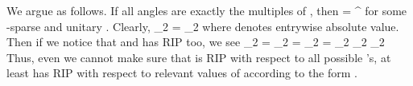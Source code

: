 We argue as follows.
If all angles  are exactly the multiples of , then
 {
\NC {}
=\NC {}    ^\dagger \NR
}
for some -sparse  and unitary .
Clearly,
 {
\NC {} _2
\NC = _2 \NR
}
where  denotes entrywise absolute value.
Then if we notice that  and  has  RIP too, we see
 {
\NC \NC {} _2 \NR
%
\NC =\NC {} _2 \NR
%
\NC =\NC {} _2 \NR
%
\NC =\NC {} _2 \D
    _2 \NR
%
\NC \eqsim \NC {} _2  \NR
}
Thus, even we cannot make sure that  is  RIP with respect to all possible 's, at least  has RIP with respect to relevant values of  according to the form .

\stopsubsection

\stopsection
